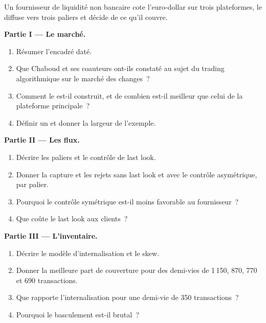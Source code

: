 \begin{problem}\label{pb:hf:fx-market-making:1}
Un fournisseur de liquidité non bancaire cote l'euro-dollar sur trois plateformes, le diffuse vers trois paliers et décide de ce qu'il couvre.

\medskip\noindent\textbf{Partie I --- Le marché.}
\begin{enumerate}
\item Résumer l'encadré daté.
\item Que Chaboud et ses coauteurs ont-ils constaté au sujet du trading algorithmique sur le marché des changes~?
\item Comment le  est-il construit, et de combien est-il meilleur que celui de la plateforme principale~?
\item Définir un  et donner la largeur de l'exemple.
\end{enumerate}

\medskip\noindent\textbf{Partie II --- Les flux.}
\begin{enumerate}[resume]
\item Décrire les paliers et le contrôle de last look.
\item Donner la capture et les rejets sans last look et avec le contrôle asymétrique, par palier.
\item Pourquoi le contrôle symétrique est-il moins favorable au fournisseur~?
\item Que coûte le last look aux clients~?
\end{enumerate}

\medskip\noindent\textbf{Partie III --- L'inventaire.}
\begin{enumerate}[resume]
\item Décrire le modèle d'internalisation et le skew.
\item Donner la meilleure part de couverture pour des demi-vies de 1\,150, 870, 770 et 690 transactions.
\item Que rapporte l'internalisation pour une demi-vie de 350 transactions~?
\item Pourquoi le basculement est-il brutal~?
\end{enumerate}


\end{problem}
